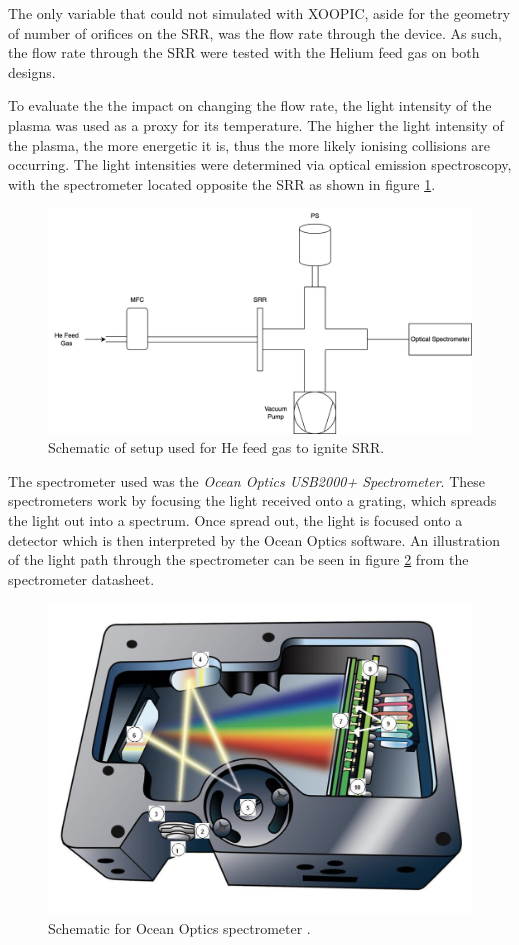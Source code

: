 
The only variable that could not simulated with XOOPIC, aside for the geometry of number of orifices on the SRR, was the flow rate through the device. As such, the flow rate through the SRR were tested with the Helium feed gas on both designs.

To evaluate the the impact on changing the flow rate, the light intensity of the plasma was used as a proxy for its temperature. The higher the light intensity of the plasma, the more energetic it is, thus the more likely ionising collisions are occurring. The light intensities were determined via optical emission spectroscopy, with the spectrometer located opposite the SRR as shown in figure \ref{fig:he_testing_setup}.

\begin{figure}[h!]
	\centering
	\includegraphics[width=0.8\linewidth]{chapter_4/figures/he_testing_setup.png}
	\caption{Schematic of setup used for He feed gas to ignite SRR.}
	\label{fig:he_testing_setup}
\end{figure}


The spectrometer used was the \textit{Ocean Optics USB2000+ Spectrometer}. These spectrometers work by focusing the light received onto a grating, which spreads the light out into a spectrum. Once spread out, the light is focused onto a detector which is then interpreted by the Ocean Optics software. An illustration of the light path through the spectrometer can be seen in figure \ref{fig:optical_spectrometer} from the spectrometer datasheet. 

\begin{figure}[h!]
	\centering
	\includegraphics[width=0.6\linewidth]{chapter_4/figures/optical_spectrometer.png}
	\caption{Schematic for Ocean Optics spectrometer \cite{oo_spectrometer}.}
	\label{fig:optical_spectrometer}
\end{figure}

